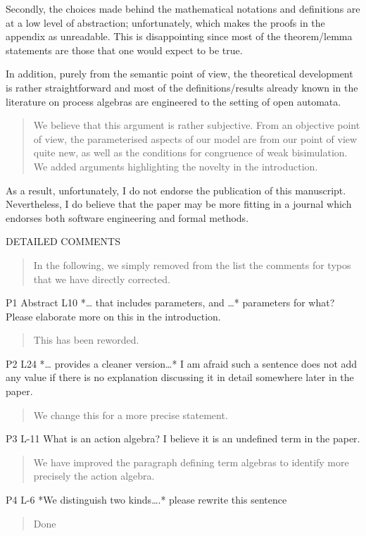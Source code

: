 \documentclass{article}
\begin{document}
Secondly, the choices made behind the mathematical notations and definitions are at a low level of abstraction; unfortunately, which makes the proofs in the appendix as unreadable. This is disappointing since most of the theorem/lemma statements are those that one would expect to be true. 


In addition, purely from the semantic point of view, the theoretical development is rather straightforward and most of the definitions/results already known in the literature on process algebras are engineered to the setting of open automata. 
\begin{quote}
We believe that this argument is rather subjective. From an objective point of view, the parameterised aspects of our model are from our point of view quite new, as well as the conditions for congruence of weak bisimulation. We added arguments highlighting the novelty in the introduction.
\end{quote}


As a result, unfortunately, I do not endorse the publication of this manuscript. Nevertheless, I do believe that the paper may be more fitting in a journal which endorses both software engineering and formal methods.




DETAILED COMMENTS
\begin{quote}
In the following, we simply removed from the list the comments for typos that we have directly corrected.
\end{quote}

P1 Abstract L10 *… that includes parameters, and …* parameters for what? Please elaborate more on this in the introduction.
\begin{quote}
This has been reworded.
\end{quote}

P2 L24 *… provides a cleaner version…* I am afraid such a sentence does not add any value if there is no explanation discussing it in detail somewhere later in the paper.
\begin{quote}
We change this for a more precise statement.
\end{quote}


P3 L-11 What is an action algebra? I believe it is an undefined term in the paper.
\begin{quote}
We have improved the paragraph defining term algebras to identify more precisely the action algebra.
\end{quote}


P4 L-6 *We distinguish two kinds….* please rewrite this sentence
\begin{quote}
Done
\end{quote}
\end{document}
